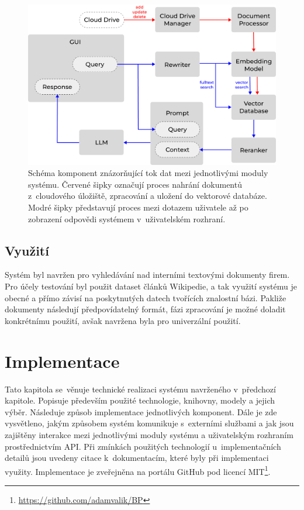 \begin{figure}[H]
    \centering
    \includegraphics[width=1\linewidth]{obrazky/system.pdf}
    \caption{Schéma komponent znázorňující tok dat mezi jednotlivými moduly systému. Červené šipky označují proces nahrání dokumentů z~cloudového úložiště, zpracování a uložení do vektorové databáze. Modré šipky představují proces mezi dotazem uživatele až po zobrazení odpovědi systémem v~uživatelském rozhraní.}
    \label{fig:flow}
\end{figure}

\section{Využití}
Systém byl navržen pro vyhledávání nad interními textovými dokumenty firem. Pro účely testování byl použit dataset článků Wikipedie, a tak využití systému je obecné a přímo závisí na poskytnutých datech tvořících znalostní bázi. Pakliže dokumenty následují předpovídatelný formát, fázi zpracování je možné doladit konkrétnímu použití, avšak navržena byla pro univerzální použití.


\chapter{Implementace}
\label{implementace}
Tato kapitola se~věnuje technické realizaci systému navrženého v~předchozí kapitole. Popisuje především použité technologie, knihovny, modely a jejich výběr. Následuje způsob implementace jednotlivých komponent. Dále je zde vysvětleno, jakým způsobem systém komunikuje s~externími službami a jak jsou zajištěny interakce mezi jednotlivými moduly systému a uživatelským rozhraním prostřednictvím API. Při zmínkách použitých technologií u~implementačních detailů jsou uvedeny citace k~dokumentacím, které byly při implementaci využity. Implementace je zveřejněna na portálu GitHub pod licencí MIT\footnote{\url{https://github.com/adamvalik/BP}}.

